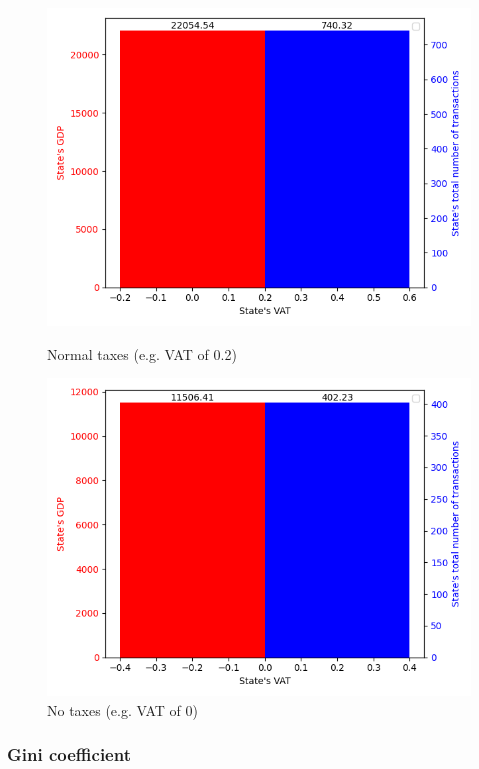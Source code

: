         \begin{figure}[H]
                \includegraphics[width=\linewidth]{img/exp/1_1_1.png}
                \caption{Normal taxes (e.g. VAT of 0.2)}
            \endminipage\hfill
                \includegraphics[width=\linewidth]{img/exp/1_2_1.png}
                \caption{No taxes (e.g. VAT of 0)}
            \endminipage\hfill
        \end{figure}

        \subsubsection{Gini coefficient} 
        
